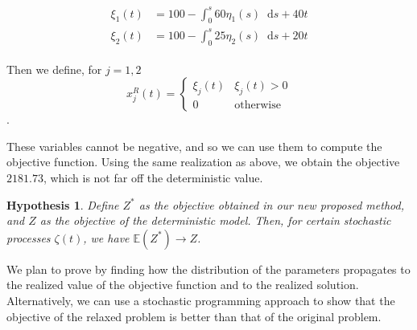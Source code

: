\documentclass[11pt,a4paper,titlepage]{article}
\newcommand*{\dd}{\ensuremath{\mathop{}\!\mathrm{d}}}%
\theoremstyle{definition}
\theoremstyle{plain}
\newtheorem{claim}{Hypothesis}
\begin{document}
    \begin{align}
        \begin{split}
            \xi_1(t) & = 100 - \int_0^s 60 \eta_1(s) \dd s  + 40t \\
            \xi_2(t) & = 100 - \int_0^s 25 \eta_2(s) \dd s  + 20t
        \end{split}
    \end{align}

    Then we define, for $j=1,2$
    \begin{equation}
        x_j^R(t) =
        \begin{cases}
            \xi_j(t) & \xi_j(t) > 0 \\
            0 & \text{otherwise}
        \end{cases}
    \end{equation}.

    These variables cannot be negative,
    and so we can use them to compute the objective function.
    Using the same realization as above,
    we obtain the objective $2181.73$,
    which is not far off the deterministic value.

    \begin{claim}
        \label{claim:newmodel-converge}
        Define $Z^*$ as the objective obtained in our new proposed method,
        and $Z$ as the objective of the deterministic model.
        Then,
        for certain stochastic processes $\zeta(t)$,
        we have $\mathbb{E}(Z^*) \to Z$.
    \end{claim}

    We plan to prove  by  finding how the distribution of the parameters propagates to the realized value of the objective function and to the realized solution. Alternatively, we can use a stochastic programming approach to show that the objective of the relaxed problem is better than that of the original problem.

    \clearpage
    \printbibliography
    \label{sec:bibliography}
\end{document}
